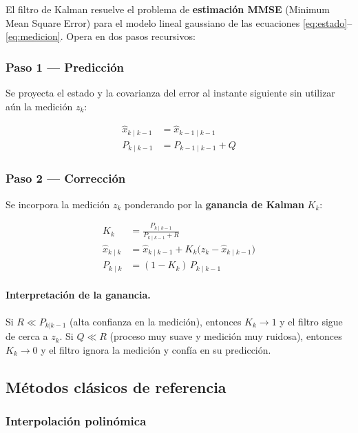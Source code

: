 \documentclass[12pt,a4paper]{article}
\begin{document}
El filtro de Kalman resuelve el problema de \textbf{estimación MMSE}
(Minimum Mean Square Error) para el modelo lineal gaussiano de las
ecuaciones \eqref{eq:estado}--\eqref{eq:medicion}.
Opera en dos pasos recursivos:

\subsubsection*{Paso 1 — Predicción}

Se proyecta el estado y la covarianza del error al instante siguiente sin
utilizar aún la medición $z_k$:

\begin{align}
  \hat{x}_{k \mid k-1} &= \hat{x}_{k-1 \mid k-1} \label{eq:pred_x}\\
  P_{k \mid k-1}        &= P_{k-1 \mid k-1} + Q   \label{eq:pred_P}
\end{align}

\subsubsection*{Paso 2 — Corrección}

Se incorpora la medición $z_k$ ponderando por la \textbf{ganancia de Kalman} $K_k$:

\begin{align}
  K_k &= \frac{P_{k \mid k-1}}{P_{k \mid k-1} + R} \label{eq:ganancia}\\
  \hat{x}_{k \mid k} &= \hat{x}_{k \mid k-1} + K_k \bigl(z_k - \hat{x}_{k \mid k-1}\bigr) \label{eq:correc_x}\\
  P_{k \mid k} &= (1 - K_k)\,P_{k \mid k-1} \label{eq:correc_P}
\end{align}

\paragraph{Interpretación de la ganancia.}
Si $R \ll P_{k|k-1}$ (alta confianza en la medición), entonces $K_k \to 1$
y el filtro sigue de cerca a $z_k$.
Si $Q \ll R$ (proceso muy suave y medición muy ruidosa), entonces $K_k \to 0$
y el filtro ignora la medición y confía en su predicción.

\subsection{Métodos clásicos de referencia}

\subsubsection*{Interpolación polinómica}
\end{document}
